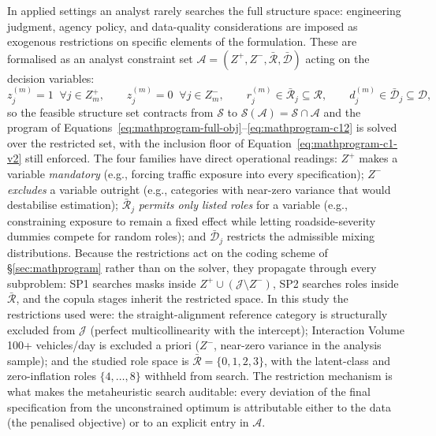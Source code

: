 \documentclass[letterpaper,8pt]{extarticle}  %
\begin{document}
\begin{doublespacing}
\begin{linenumbers}
In applied settings an analyst rarely searches the full structure space: engineering judgment, agency policy, and data-quality considerations are imposed as exogenous restrictions on specific elements of the formulation. These are formalised as an analyst constraint set $\mathcal{A} = (Z^{+}, Z^{-}, \bar{\mathcal{R}}, \bar{\mathcal{D}})$ acting on the decision variables:
\begin{equation}
  z_j^{(m)} = 1 \;\; \forall j \in Z^{+}_m, \qquad
  z_j^{(m)} = 0 \;\; \forall j \in Z^{-}_m, \qquad
  r_j^{(m)} \in \bar{\mathcal{R}}_j \subseteq \mathcal{R}, \qquad
  d_j^{(m)} \in \bar{\mathcal{D}}_j \subseteq \mathcal{D},
  \label{eq:analyst-constraints}
\end{equation}
so the feasible structure set contracts from $\mathcal{S}$ to $\mathcal{S}(\mathcal{A}) = \mathcal{S} \cap \mathcal{A}$ and the program of Equations~\eqref{eq:mathprogram-full-obj}--\eqref{eq:mathprogram-c12} is solved over the restricted set, with the inclusion floor of Equation~\eqref{eq:mathprogram-c1-v2} still enforced. The four families have direct operational readings: $Z^{+}$ makes a variable \emph{mandatory} (e.g., forcing traffic exposure into every specification); $Z^{-}$ \emph{excludes} a variable outright (e.g., categories with near-zero variance that would destabilise estimation); $\bar{\mathcal{R}}_j$ \emph{permits only listed roles} for a variable (e.g., constraining exposure to remain a fixed effect while letting roadside-severity dummies compete for random roles); and $\bar{\mathcal{D}}_j$ restricts the admissible mixing distributions. Because the restrictions act on the coding scheme of \S\ref{sec:mathprogram} rather than on the solver, they propagate through every subproblem: SP1 searches masks inside $Z^{+} \cup (\mathcal{J} \setminus Z^{-})$, SP2 searches roles inside $\bar{\mathcal{R}}$, and the copula stages inherit the restricted space. In this study the restrictions used were: the straight-alignment reference category is structurally excluded from $\mathcal{J}$ (perfect multicollinearity with the intercept); Interaction Volume 100+ vehicles/day is excluded a priori ($Z^{-}$, near-zero variance in the analysis sample); and the studied role space is $\bar{\mathcal{R}} = \{0,1,2,3\}$, with the latent-class and zero-inflation roles $\{4,\dots,8\}$ withheld from search. The restriction mechanism is what makes the metaheuristic search auditable: every deviation of the final specification from the unconstrained optimum is attributable either to the data (the penalised objective) or to an explicit entry in $\mathcal{A}$.


\end{linenumbers}
\end{doublespacing}
\end{document}
